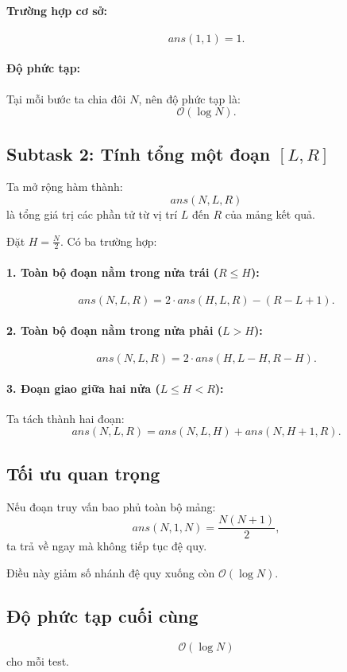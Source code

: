 \paragraph{Trường hợp cơ sở:}
\[
ans(1,1) = 1.
\]

\paragraph{Độ phức tạp:}
Tại mỗi bước ta chia đôi $N$, nên độ phức tạp là:
\[
\mathcal{O}(\log N).
\]

\subsection*{Subtask 2: Tính tổng một đoạn $[L,R]$}

Ta mở rộng hàm thành:
\[
ans(N,L,R)
\]
là tổng giá trị các phần tử từ vị trí $L$ đến $R$ của mảng kết quả.

Đặt $H = \frac{N}{2}$. Có ba trường hợp:

\paragraph{1. Toàn bộ đoạn nằm trong nửa trái ($R \le H$):}
\[
ans(N,L,R)
= 2 \cdot ans(H,L,R) - (R-L+1).
\]

\paragraph{2. Toàn bộ đoạn nằm trong nửa phải ($L > H$):}
\[
ans(N,L,R)
= 2\cdot ans(H, L-H, R-H).
\]

\paragraph{3. Đoạn giao giữa hai nửa ($L \le H < R$):}

Ta tách thành hai đoạn:
\[
ans(N,L,R) = ans(N,L,H) + ans(N,H+1,R).
\]

\subsection*{Tối ưu quan trọng}

Nếu đoạn truy vấn bao phủ toàn bộ mảng:
\[
ans(N,1,N) = \frac{N(N+1)}{2},
\]
ta trả về ngay mà không tiếp tục đệ quy.

Điều này giảm số nhánh đệ quy xuống còn $\mathcal{O}(\log N)$.

\subsection*{Độ phức tạp cuối cùng}
\[
\mathcal{O}(\log N)
\]
cho mỗi test.

